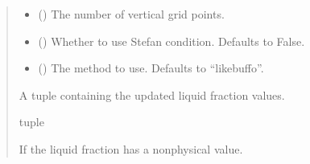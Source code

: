 \documentclass[a4paper,11pt,english,openany]{sphinxmanual}
\begin{document}
\begin{fulllineitems}
\begin{quote}
\begin{description}
\begin{itemize}
\item {} 
\sphinxAtStartPar
{} () \textendash{} The number of vertical grid points.

\item {} 
\sphinxAtStartPar
{} (\sphinxstyleliteralemphasis{\sphinxupquote{, }}) \textendash{} Whether to use Stefan condition. Defaults to False.

\item {} 
\sphinxAtStartPar
{} (\sphinxstyleliteralemphasis{\sphinxupquote{, }}) \textendash{} The method to use. Defaults to “likebuffo”.

\end{itemize}

\sphinxAtStartPar
A tuple containing the updated liquid fraction values.

\sphinxAtStartPar
tuple

\sphinxAtStartPar
{} \textendash{} If the liquid fraction has a non\sphinxhyphen{}physical value.

\end{description}\end{quote}

\end{fulllineitems}

\end{document}
